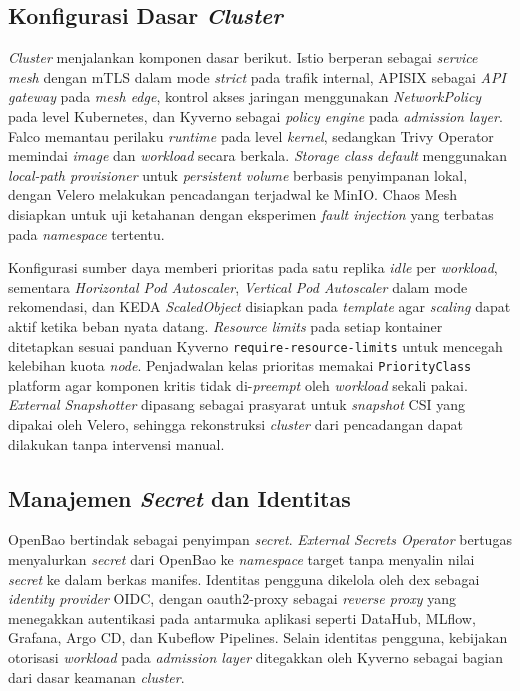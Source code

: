 \subsection{Konfigurasi Dasar \textit{Cluster}}
\label{subsec:cluster}

\textit{Cluster} menjalankan komponen dasar berikut. Istio \autocite{istio2024} berperan sebagai \textit{service mesh} dengan mTLS dalam mode \textit{strict} pada trafik internal, APISIX \autocite{apisix2025} sebagai \textit{API gateway} pada \textit{mesh edge}, kontrol akses jaringan menggunakan \textit{NetworkPolicy} pada level Kubernetes, dan Kyverno \autocite{kyverno2024} sebagai \textit{policy engine} pada \textit{admission layer}. Falco \autocite{falco2025} memantau perilaku \textit{runtime} pada level \textit{kernel}, sedangkan Trivy Operator \autocite{trivy2025} memindai \textit{image} dan \textit{workload} secara berkala. \textit{Storage class} \textit{default} menggunakan \textit{local-path provisioner} untuk \textit{persistent volume} berbasis penyimpanan lokal, dengan Velero \autocite{velero2025} melakukan pencadangan terjadwal ke MinIO. Chaos Mesh \autocite{chaosmesh2025} disiapkan untuk uji ketahanan dengan eksperimen \textit{fault injection} yang terbatas pada \textit{namespace} tertentu.

Konfigurasi sumber daya memberi prioritas pada satu replika \textit{idle} per \textit{workload}, sementara \textit{Horizontal Pod Autoscaler}, \textit{Vertical Pod Autoscaler} dalam mode rekomendasi, dan KEDA \textit{ScaledObject} disiapkan pada \textit{template} agar \textit{scaling} dapat aktif ketika beban nyata datang. \textit{Resource limits} pada setiap kontainer ditetapkan sesuai panduan Kyverno \texttt{require-resource-limits} untuk mencegah kelebihan kuota \textit{node}. Penjadwalan kelas prioritas memakai \texttt{PriorityClass} platform agar komponen kritis tidak di-\textit{preempt} oleh \textit{workload} sekali pakai. \textit{External Snapshotter} dipasang sebagai prasyarat untuk \textit{snapshot} CSI yang dipakai oleh Velero, sehingga rekonstruksi \textit{cluster} dari pencadangan dapat dilakukan tanpa intervensi manual.

\subsection{Manajemen \textit{Secret} dan Identitas}
\label{subsec:rahasia-identitas}

OpenBao \autocite{openbao2025} bertindak sebagai penyimpan \textit{secret}. \textit{External Secrets Operator} bertugas menyalurkan \textit{secret} dari OpenBao ke \textit{namespace} target tanpa menyalin nilai \textit{secret} ke dalam berkas manifes. Identitas pengguna dikelola oleh dex \autocite{dex2025} sebagai \textit{identity provider} OIDC, dengan oauth2-proxy \autocite{oauth2proxy2025} sebagai \textit{reverse proxy} yang menegakkan autentikasi pada antarmuka aplikasi seperti DataHub, MLflow, Grafana, Argo CD, dan Kubeflow Pipelines. Selain identitas pengguna, kebijakan otorisasi \textit{workload} pada \textit{admission layer} ditegakkan oleh Kyverno \autocite{kyverno2024} sebagai bagian dari dasar keamanan \textit{cluster}.

